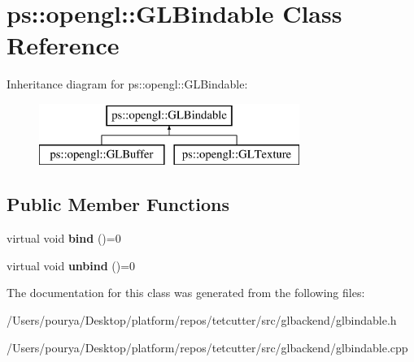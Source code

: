 \hypertarget{classps_1_1opengl_1_1GLBindable}{}\section{ps\+:\+:opengl\+:\+:G\+L\+Bindable Class Reference}
\label{classps_1_1opengl_1_1GLBindable}
Inheritance diagram for ps\+:\+:opengl\+:\+:G\+L\+Bindable\+:\begin{figure}[H]
\begin{center}
\leavevmode
\includegraphics[height=2.000000cm]{classps_1_1opengl_1_1GLBindable}
\end{center}
\end{figure}
\subsection*{Public Member Functions}
\begin{DoxyCompactItemize}
\item 
\hypertarget{classps_1_1opengl_1_1GLBindable_afba8e1354f41b4b403c8c6bc46189644}{}virtual void {\bfseries bind} ()=0\label{classps_1_1opengl_1_1GLBindable_afba8e1354f41b4b403c8c6bc46189644}

\item 
\hypertarget{classps_1_1opengl_1_1GLBindable_acd6f392309e94936dc1d01d146877da4}{}virtual void {\bfseries unbind} ()=0\label{classps_1_1opengl_1_1GLBindable_acd6f392309e94936dc1d01d146877da4}

\end{DoxyCompactItemize}


The documentation for this class was generated from the following files\+:\begin{DoxyCompactItemize}
\item 
/\+Users/pourya/\+Desktop/platform/repos/tetcutter/src/glbackend/glbindable.\+h\item 
/\+Users/pourya/\+Desktop/platform/repos/tetcutter/src/glbackend/glbindable.\+cpp\end{DoxyCompactItemize}
